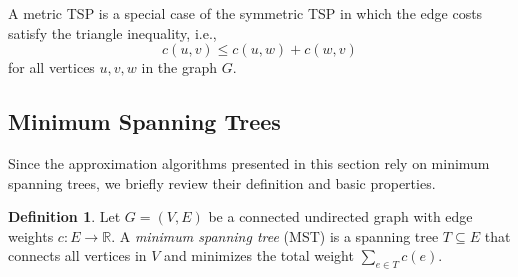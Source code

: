 \documentclass[12pt]{report}
\theoremstyle{definition}
\newtheorem{definition}{Definition}
\begin{document}
A metric TSP is a special case of the symmetric TSP in which the edge costs satisfy the triangle inequality, i.e.,
\[
c(u,v) \leq c(u,w) + c(w,v)
\]
for all vertices $u,v,w$ in the graph $G$.

\subsection{Minimum Spanning Trees}

Since the approximation algorithms presented in this section rely on minimum spanning trees, we briefly review their definition and basic properties.

\begin{definition}
Let $G=(V,E)$ be a connected undirected graph with edge weights $c : E \to \mathbb{R}$. A \emph{minimum spanning tree} (MST) is a spanning tree $T \subseteq E$ that connects all vertices in $V$ and minimizes the total weight $\sum_{e \in T} c(e)$.
\end{definition}
\end{document}
